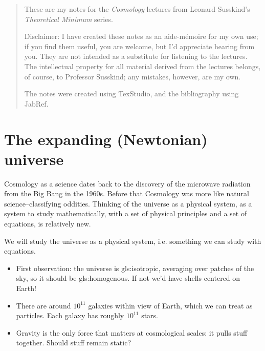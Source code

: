 \documentclass[]{article}
\begin{document}
	
\maketitle

\begin{abstract}
	These are my notes for the \emph{Cosmology}\cite{susskind2013cosmology} lectures from Leonard Susskind's \emph{Theoretical Minimum} series\cite{susskind2007theoretical}. 
	
	Disclaimer: I have created these notes as an aide-m\'emoire for my own use; if you find them useful, you are welcome, but I'd appreciate hearing from you. They are not intended as a substitute for listening to the lectures. The intellectual property for all material derived from the lectures belongs, of course, to Professor Susskind; any mistakes, however, are my own.
	
	The notes were created using TexStudio\cite{TexStudio}, and the bibliography using JabRef\cite{Jabref}.
\end{abstract}




\tableofcontents
\listoffigures
\listoftables
\listoftheorems
			
\section{The expanding (Newtonian) universe}\label{sec:expanding:newton}

Cosmology as a science dates back to the discovery of the microwave radiation from the Big Bang in the 1960s. Before that Cosmology was more like natural science--classifying oddities. Thinking of the universe as a physical system, as a system to study mathematically, with a set of physical principles and a set of equations, is relatively new.

We will study the universe as a physical system, i.e. something we can study with equations.

\begin{itemize}
	\item First observation: the universe is \gls{gls:isotropic}, averaging over patches of the sky, so it should be \gls{gls:homogenous}. If not we'd have shells centered on Earth!

	\item There are around $10^{11}$ galaxies within view of Earth, which we can treat as particles. Each galaxy has roughly $10^{11}$ stars.
	
	\item Gravity is the only force that matters at cosmological scales: it pulls stuff together. Should stuff remain static?
\end{itemize}
\end{document}
